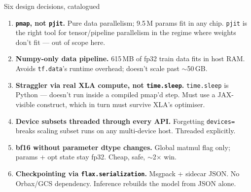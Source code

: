 \documentclass[aspectratio=169,10pt]{beamer}
\begin{document}
\begin{frame}{Six design decisions, catalogued}
  \small
  \begin{enumerate}
    \item \textbf{\texttt{pmap}, not \texttt{pjit}.} Pure data parallelism; 9.5\,M params
          fit in any chip. \texttt{pjit} is the right tool for tensor/pipeline parallelism
          in the regime where weights don't fit — out of scope here.
    \item \textbf{Numpy-only data pipeline.} 615\,MB of fp32 train data fits in host RAM.
          Avoids \texttt{tf.data}'s runtime overhead; doesn't scale past $\sim$50\,GB.
    \item \textbf{Straggler via real XLA compute, not \texttt{time.sleep}.}
          \texttt{time.sleep} is Python — doesn't run inside a compiled pmap'd step.
          Must use a JAX-visible construct, which in turn must survive XLA's optimiser.
    \item \textbf{Device subsets threaded through every API.} Forgetting \texttt{devices=}
          breaks scaling subset runs on any multi-device host. Threaded explicitly.
    \item \textbf{bf16 without parameter dtype changes.} Global matmul flag only;
          params + opt state stay fp32. Cheap, safe, $\sim$2$\times$ win.
    \item \textbf{Checkpointing via \texttt{flax.serialization}.} Msgpack + sidecar JSON.
          No Orbax/GCS dependency. Inference rebuilds the model from JSON alone.
  \end{enumerate}
\end{frame}
\end{document}
